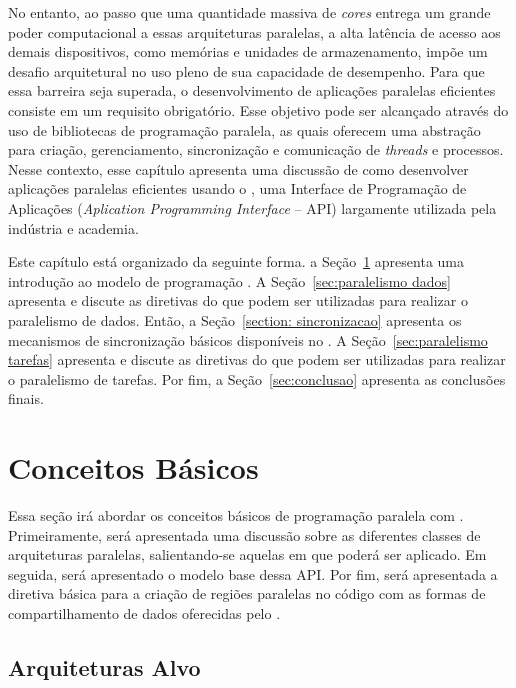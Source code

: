 \documentclass{SBCbookchapter}
\begin{document}
	No entanto, ao passo que uma quantidade massiva de \textit{cores}
	entrega um grande poder computacional a essas arquiteturas
	paralelas, a alta latência de acesso aos demais dispositivos, como
	memórias e unidades de armazenamento, impõe um desafio arquitetural
	no uso pleno de sua capacidade de desempenho. Para que essa barreira
	seja superada, o desenvolvimento de aplicações paralelas eficientes
	consiste em um requisito obrigatório. Esse objetivo pode ser
	alcançado através do uso de bibliotecas de programação paralela, as
	quais oferecem uma abstração para criação, gerenciamento,
	sincronização e comunicação de \textit{threads} e processos. Nesse
	contexto, esse capítulo apresenta uma discussão de como desenvolver
	aplicações paralelas eficientes usando o \openmp, uma Interface de
	Programação de Aplicações (\textit{Aplication Programming Interface}
	-- API) largamente utilizada pela indústria e academia. 
	
	Este capítulo está organizado da seguinte forma. a
	Seção~\ref{sec:conceitos basicos} apresenta uma introdução ao modelo
	de programação \openmp.  A Seção~\ref{sec:paralelismo dados}
	apresenta e discute as diretivas do \openmp que podem ser utilizadas
	para realizar o paralelismo de dados.  Então, a Seção~\ref{section:
	sincronizacao} apresenta os mecanismos de sincronização básicos
	disponíveis no \openmp. A Seção~\ref{sec:paralelismo tarefas}
	apresenta e discute as diretivas do \openmp que podem ser utilizadas
	para realizar o paralelismo de tarefas. Por fim, a
	Seção~\ref{sec:conclusao} apresenta as conclusões finais.

\section{Conceitos Básicos}
\label{sec:conceitos basicos}

	Essa seção irá abordar os conceitos básicos de programação paralela
	com \openmp. Primeiramente, será apresentada uma discussão sobre as
	diferentes classes de arquiteturas paralelas, salientando-se aquelas
	em que \openmp poderá ser aplicado.	Em seguida, será apresentado o
	modelo base dessa API.  Por fim, será apresentada a diretiva básica
	para a criação de regiões paralelas no código com as formas de
	compartilhamento de dados oferecidas pelo \openmp.

	\subsection{Arquiteturas Alvo}
\end{document}
